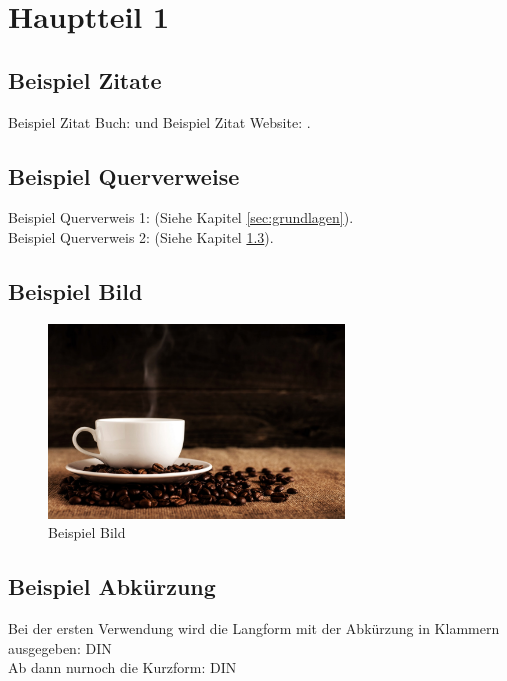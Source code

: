 \section{Hauptteil 1}\label{sec:hauptteil1}

\subsection{Beispiel Zitate}\label{subsec:beispielZitate}

Beispiel Zitat Buch: \cite[S. 25-26]{bspBuch2009} und Beispiel Zitat Website: \cite{bspWebsite2014}.


\subsection{Beispiel Querverweise}\label{subsec:beispielQuerverweise}

Beispiel Querverweis 1: (Siehe Kapitel \ref{sec:grundlagen}). \\

Beispiel Querverweis 2: (Siehe Kapitel \ref{subsec:beispielBild}). 


\subsection{Beispiel Bild}\label{subsec:beispielBild}

\begin{figure}[htbp] 
  \centering
     \includegraphics[width=0.7\textwidth]{resources/img/example_picture.jpg}
  \caption{Beispiel Bild}
  \label{fig:Bild1}
\end{figure}


\subsection{Beispiel Abkürzung}\label{subsec:beispielAbkuerzung}

Bei der ersten Verwendung wird die Langform mit der Abkürzung in Klammern ausgegeben: \ac{DIN} \\

Ab dann nurnoch die Kurzform:  \ac{DIN} 
